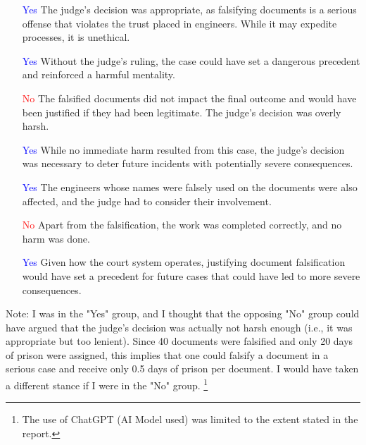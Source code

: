 \documentclass[12pt]{article}
\begin{document}
\begin{itemize}
    \item [\textcolor{blue}{Yes}] The judge's decision was appropriate, as falsifying documents is a serious offense that violates the trust placed in engineers. While it may expedite processes, it is unethical.
    \item [\textcolor{blue}{Yes}] Without the judge's ruling, the case could have set a dangerous precedent and reinforced a harmful mentality.
    \item [\textcolor{red}{No}] The falsified documents did not impact the final outcome and would have been justified if they had been legitimate. The judge's decision was overly harsh.
    \item [\textcolor{blue}{Yes}] While no immediate harm resulted from this case, the judge's decision was necessary to deter future incidents with potentially severe consequences.
    \item [\textcolor{blue}{Yes}] The engineers whose names were falsely used on the documents were also affected, and the judge had to consider their involvement.
    \item [\textcolor{red}{No}] Apart from the falsification, the work was completed correctly, and no harm was done.
    \item [\textcolor{blue}{Yes}] Given how the court system operates, justifying document falsification would have set a precedent for future cases that could have led to more severe consequences.
\end{itemize}

Note: I was in the "Yes" group, and I thought that the opposing "No" group could have argued that the judge's decision was actually not harsh enough (i.e., it was appropriate but too lenient). Since 40 documents were falsified and only 20 days of prison were assigned, this implies that one could falsify a document in a serious case and receive only 0.5 days of prison per document. I would have taken a different stance if I were in the "No" group.
\footnote{The use of ChatGPT (AI Model used) was limited to the extent stated in the report.}
\pagebreak


\end{document}
